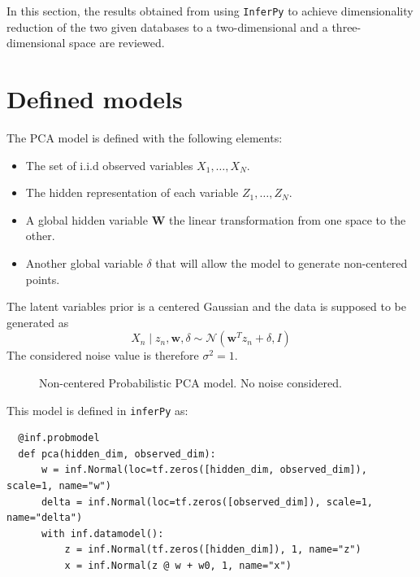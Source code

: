 
In this section, the results obtained from using \texttt{InferPy} to achieve dimensionality reduction of the two given databases to a two-dimensional and a three-dimensional space are reviewed.


\section{Defined models}

The PCA model is defined with the following elements:
\begin{itemize}
  \item The set of i.i.d observed variables \(X_{1},\dots,X_{N}\).
  \item The hidden representation of each variable \(Z_{1}, \dots, Z_{N}\).
  \item A global hidden variable \(\bm{W}\) the linear transformation from one space to the other.
  \item Another global variable \( \delta \) that will allow the model to generate non-centered points.
\end{itemize}

The latent variables prior is a centered Gaussian and the data is supposed to be generated as
\[
     X_n \mid z_n, \bm{w}, \delta \sim \mathcal{N}(\bm{w}^T z_n + \delta, I)
\]
The considered noise value is therefore \(\sigma^{2} = 1\).

\begin{figure}[h!]
  \centering
  \caption{Non-centered Probabilistic PCA model. No noise considered.}
\end{figure}

This model is defined in \texttt{inferPy} as:
\begin{verbatim}
  @inf.probmodel
  def pca(hidden_dim, observed_dim):
      w = inf.Normal(loc=tf.zeros([hidden_dim, observed_dim]), scale=1, name="w")
      delta = inf.Normal(loc=tf.zeros([observed_dim]), scale=1, name="delta")
      with inf.datamodel():
          z = inf.Normal(tf.zeros([hidden_dim]), 1, name="z")
          x = inf.Normal(z @ w + w0, 1, name="x")
        \end{verbatim}

